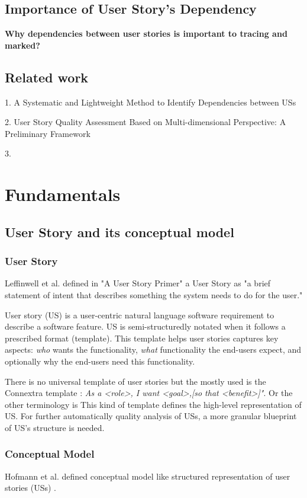 \documentclass[a4paper, 11 pt, leqno, titlepage = true, toc=bib, oneside]{scrbook}
\begin{document}
\section{Importance of User Story's Dependency}
\textbf{Why dependencies between user stories is important to tracing and marked?}

\section{Related work}
1. A Systematic and Lightweight Method to Identify Dependencies between USs

2. User Story Quality Assessment Based on Multi-dimensional Perspective: A Preliminary Framework

3.


\chapter{Fundamentals}
\section{User Story and its conceptual model}
\subsection{User Story}
Leffinwell et al. defined in "A User Story Primer" a User Story as "a brief statement of intent that describes something the system needs to do for the user."\cite{Leffingwell2009}
\begin{defin}
    User story (US) is a user-centric natural language software requirement to describe a software feature.
    US is semi-structuredly notated when it follows a prescribed format (template). This template helps user stories captures key aspects: \textit{who} wants the functionality, \textit{what} functionality the end-users expect, and optionally why the end-users need this functionality.
\end{defin}
There is no universal template of user stories but the mostly used is the Connextra template \cite{3}: \textit{As a <role>, I want <goal>,[so that <benefit>]"}. Or the other terminology is  This kind of template defines the high-level representation of US.
For further automatically quality analysis of USs, a more granular blueprint of US's structure is needed.
\subsection{Conceptual Model}
Hofmann et al. defined conceptual model like structured representation of user stories (USs) \cite{4}.
\end{document}

